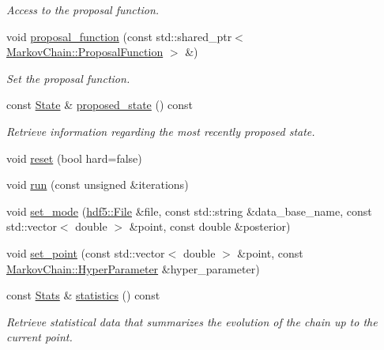 \begin{DoxyCompactItemize}
\begin{DoxyCompactList}\small\item\em Access to the proposal function. \item\end{DoxyCompactList}\item 
void \hyperlink{classeos_1_1MarkovChain_a7fcacec6a56edd50b12efb67dcea432f}{proposal\_\-function} (const std::shared\_\-ptr$<$ \hyperlink{structeos_1_1MarkovChain_1_1ProposalFunction}{MarkovChain::ProposalFunction} $>$ \&)
\begin{DoxyCompactList}\small\item\em Set the proposal function. \item\end{DoxyCompactList}\item 
const \hyperlink{structeos_1_1MarkovChain_1_1State}{State} \& \hyperlink{classeos_1_1MarkovChain_a094a7852f4983a3c26e6a062b66f2547}{proposed\_\-state} () const 
\begin{DoxyCompactList}\small\item\em Retrieve information regarding the most recently proposed state. \item\end{DoxyCompactList}\item 
void \hyperlink{classeos_1_1MarkovChain_a4e54cc6e32c7bb258804b76988ab7f0b}{reset} (bool hard=false)
\item 
void \hyperlink{classeos_1_1MarkovChain_abc73ca1b9fc5bdafba43c799e75192c8}{run} (const unsigned \&iterations)
\item 
void \hyperlink{classeos_1_1MarkovChain_a24a9d7e2f6f930594dd7140acd6180bb}{set\_\-mode} (\hyperlink{classeos_1_1hdf5_1_1File}{hdf5::File} \&file, const std::string \&data\_\-base\_\-name, const std::vector$<$ double $>$ \&point, const double \&posterior)
\item 
void \hyperlink{classeos_1_1MarkovChain_a84d4342221f7f6a826d0a9a2480165c4}{set\_\-point} (const std::vector$<$ double $>$ \&point, const \hyperlink{structeos_1_1MarkovChain_1_1HyperParameter}{MarkovChain::HyperParameter} \&hyper\_\-parameter)
\item 
const \hyperlink{structeos_1_1MarkovChain_1_1Stats}{Stats} \& \hyperlink{classeos_1_1MarkovChain_af48c29cabc958e061f699e595ffa3294}{statistics} () const 
\begin{DoxyCompactList}\small\item\em Retrieve statistical data that summarizes the evolution of the chain up to the current point. \item\end{DoxyCompactList}\end{DoxyCompactItemize}
